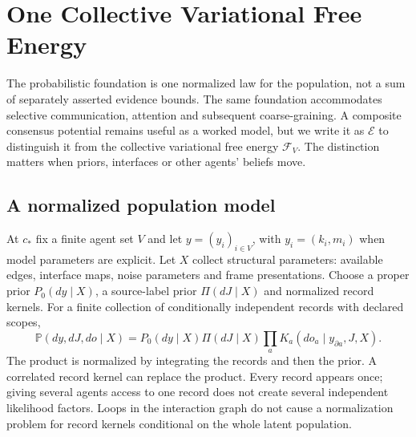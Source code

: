 \section{One Collective Variational Free Energy}\label{sec:free_energy}

The probabilistic foundation is one normalized law for the population, not a sum of separately asserted evidence bounds. The same foundation accommodates selective communication, attention and subsequent coarse-graining. A composite consensus potential remains useful as a worked model, but we write it as $\mathcal E$ to distinguish it from the collective variational free energy $\mathcal F_V$. The distinction matters when priors, interfaces or other agents' beliefs move.

\subsection{A normalized population model}
At $c_*$ fix a finite agent set $V$ and let $y=(y_i)_{i\in V}$, with $y_i=(k_i,m_i)$ when model parameters are explicit. Let $X$ collect structural parameters: available edges, interface maps, noise parameters and frame presentations. Choose a proper prior $P_0(dy\mid X)$, a source-label prior $\Pi(dJ\mid X)$ and normalized record kernels. For a finite collection of conditionally independent records with declared scopes,
\begin{equation}
\mathbb P(dy,dJ,do\mid X)
=P_0(dy\mid X)\Pi(dJ\mid X)\prod_a K_a(do_a\mid y_{\partial a},J,X).
\label{eq:population_joint}
\end{equation}
The product is normalized by integrating the records and then the prior. A correlated record kernel can replace the product. Every record appears once; giving several agents access to one record does not create several independent likelihood factors. Loops in the interaction graph do not cause a normalization problem for record kernels conditional on the whole latent population.

